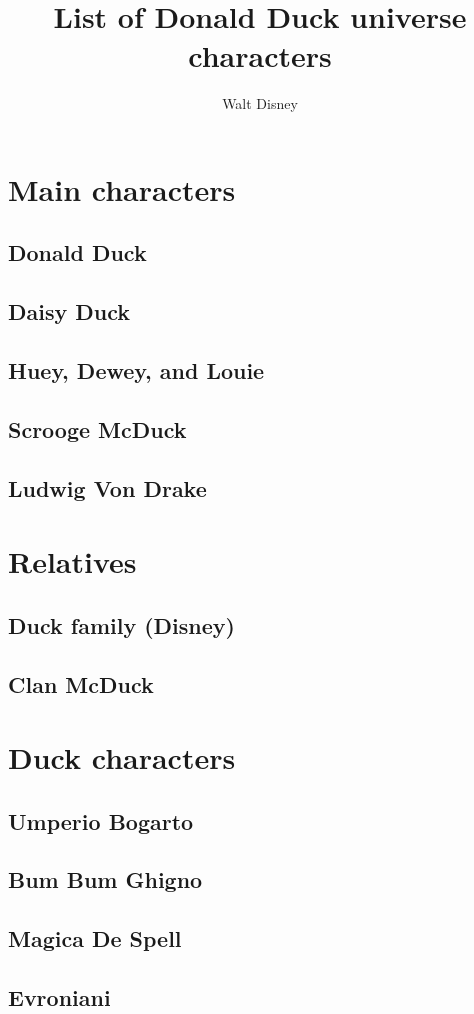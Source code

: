 \documentclass[12pt]{beamer}
\title{List of Donald Duck universe characters}
\author{Walt Disney}
\begin{document}
\section{Main characters}
\subsection{Donald Duck}
\subsection{Daisy Duck}
\subsection{Huey, Dewey, and Louie}
\subsection{Scrooge McDuck}
\subsection{Ludwig Von Drake}

\section{Relatives}
\subsection{Duck family (Disney)}
\subsection{Clan McDuck}

\section{Duck characters}
\subsection{Umperio Bogarto}
\subsection{Bum Bum Ghigno}
\subsection{Magica De Spell}
\subsection{Evroniani}
\end{document}
